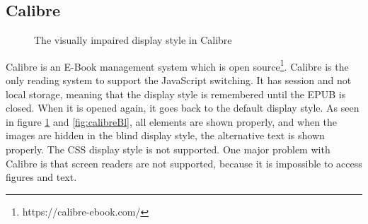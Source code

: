 \subsection{Calibre}
\begin{figure}[H]
	\centering
	\caption{The visually impaired display style in Calibre}
	\label{fig:calibreVi}
\end{figure}

Calibre is an E-Book management system which is open source\footnote{https://calibre-ebook.com/}. Calibre is the only reading system to support the JavaScript switching. It has session and not local storage, meaning that the display style is remembered until the EPUB is closed. When it is opened again, it goes back to the default display style. As seen in figure \ref{fig:calibreVi} and \ref{fig:calibreBl}, all elements are shown properly, and when the images are hidden in the blind display style, the alternative text is shown properly. The CSS display style is not supported. One major problem with Calibre is that screen readers are not supported, because it is impossible to access figures and text.

